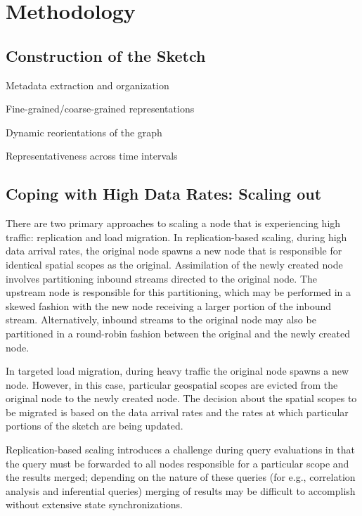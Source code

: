 

\section{Methodology}
\label{sec:methodology}

\subsection{Construction of the Sketch}
Metadata extraction and organization

Fine-grained/coarse-grained representations

Dynamic reorientations of the graph

Representativeness across time intervals


\subsection{Coping with High Data Rates: Scaling out}
\label{subsec:scaling-out}
There are two primary approaches to scaling a node that is experiencing high traffic: replication and load migration.   In replication-based scaling, during high data arrival rates, the original node spawns a new node that is responsible for identical spatial scopes as the original. Assimilation of the newly created node involves partitioning inbound streams directed to the original node. The upstream node is responsible for this partitioning, which may be performed in a skewed fashion with the new node receiving a larger portion of the inbound stream.  Alternatively, inbound streams to the original node may also be partitioned in a round-robin fashion between the original and the newly created node.

In targeted load migration, during heavy traffic the original node spawns a new node. However, in this case, particular geospatial scopes are evicted from the original node to the newly created node. The decision about the spatial scopes to be migrated is based on the data arrival rates and the rates at which particular portions of the sketch are being updated.

Replication-based scaling introduces a challenge during query evaluations in that the query must be forwarded to all nodes responsible for a particular scope and the results merged; depending on the nature of these queries (for e.g., correlation analysis and inferential queries) merging of results may be difficult to accomplish without extensive state synchronizations.

